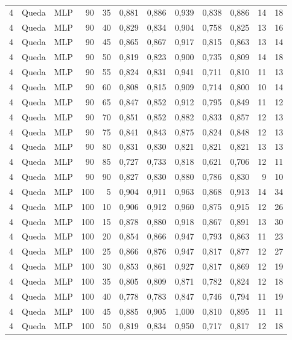 \begin{longtable}{@{}rllrrrrrrrrr@{}}
4 & Queda & MLP & 90 & 35 & 0,881 & 0,886 & 0,939 & 0,838 & 0,886 & 14 & 18 \\
4 & Queda & MLP & 90 & 40 & 0,829 & 0,834 & 0,904 & 0,758 & 0,825 & 13 & 16 \\
4 & Queda & MLP & 90 & 45 & 0,865 & 0,867 & 0,917 & 0,815 & 0,863 & 13 & 14 \\
4 & Queda & MLP & 90 & 50 & 0,819 & 0,823 & 0,900 & 0,735 & 0,809 & 14 & 18 \\
4 & Queda & MLP & 90 & 55 & 0,824 & 0,831 & 0,941 & 0,711 & 0,810 & 11 & 13 \\
4 & Queda & MLP & 90 & 60 & 0,808 & 0,815 & 0,909 & 0,714 & 0,800 & 10 & 14 \\
4 & Queda & MLP & 90 & 65 & 0,847 & 0,852 & 0,912 & 0,795 & 0,849 & 11 & 12 \\
4 & Queda & MLP & 90 & 70 & 0,851 & 0,852 & 0,882 & 0,833 & 0,857 & 12 & 13 \\
4 & Queda & MLP & 90 & 75 & 0,841 & 0,843 & 0,875 & 0,824 & 0,848 & 12 & 13 \\
4 & Queda & MLP & 90 & 80 & 0,831 & 0,830 & 0,821 & 0,821 & 0,821 & 13 & 13 \\
4 & Queda & MLP & 90 & 85 & 0,727 & 0,733 & 0,818 & 0,621 & 0,706 & 12 & 11 \\
4 & Queda & MLP & 90 & 90 & 0,827 & 0,830 & 0,880 & 0,786 & 0,830 & 9 & 10 \\
4 & Queda & MLP & 100 & 5 & 0,904 & 0,911 & 0,963 & 0,868 & 0,913 & 14 & 34 \\
4 & Queda & MLP & 100 & 10 & 0,906 & 0,912 & 0,960 & 0,875 & 0,915 & 12 & 26 \\
4 & Queda & MLP & 100 & 15 & 0,878 & 0,880 & 0,918 & 0,867 & 0,891 & 13 & 30 \\
4 & Queda & MLP & 100 & 20 & 0,854 & 0,866 & 0,947 & 0,793 & 0,863 & 11 & 23 \\
4 & Queda & MLP & 100 & 25 & 0,866 & 0,876 & 0,947 & 0,817 & 0,877 & 12 & 27 \\
4 & Queda & MLP & 100 & 30 & 0,853 & 0,861 & 0,927 & 0,817 & 0,869 & 12 & 19 \\
4 & Queda & MLP & 100 & 35 & 0,805 & 0,809 & 0,871 & 0,782 & 0,824 & 12 & 18 \\
4 & Queda & MLP & 100 & 40 & 0,778 & 0,783 & 0,847 & 0,746 & 0,794 & 11 & 19 \\
4 & Queda & MLP & 100 & 45 & 0,885 & 0,905 & 1,000 & 0,810 & 0,895 & 11 & 11 \\
4 & Queda & MLP & 100 & 50 & 0,819 & 0,834 & 0,950 & 0,717 & 0,817 & 12 & 18 \\

\end{longtable}
